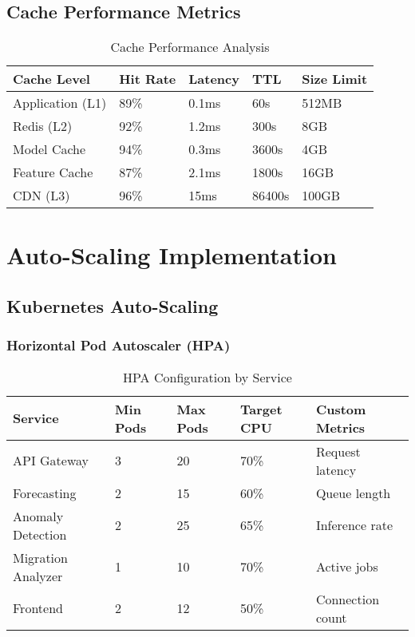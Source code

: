 \subsection{Cache Performance Metrics}

\begin{table}[H]
\centering
\caption{Cache Performance Analysis}
\begin{tabular}{|p{3cm}|p{2cm}|p{2cm}|p{2cm}|p{3cm}|}
\hline
\textbf{Cache Level} & \textbf{Hit Rate} & \textbf{Latency} & \textbf{TTL} & \textbf{Size Limit} \\
\hline
Application (L1) & 89\% & 0.1ms & 60s & 512MB \\
\hline
Redis (L2) & 92\% & 1.2ms & 300s & 8GB \\
\hline
Model Cache & 94\% & 0.3ms & 3600s & 4GB \\
\hline
Feature Cache & 87\% & 2.1ms & 1800s & 16GB \\
\hline
CDN (L3) & 96\% & 15ms & 86400s & 100GB \\
\hline
\end{tabular}
\end{table}

\section{Auto-Scaling Implementation}

\subsection{Kubernetes Auto-Scaling}

\subsubsection{Horizontal Pod Autoscaler (HPA)}

\begin{table}[H]
\centering
\caption{HPA Configuration by Service}
\begin{tabular}{|p{3cm}|p{2cm}|p{2cm}|p{2cm}|p{3cm}|}
\hline
\textbf{Service} & \textbf{Min Pods} & \textbf{Max Pods} & \textbf{Target CPU} & \textbf{Custom Metrics} \\
\hline
API Gateway & 3 & 20 & 70\% & Request latency \\
\hline
Forecasting & 2 & 15 & 60\% & Queue length \\
\hline
Anomaly Detection & 2 & 25 & 65\% & Inference rate \\
\hline
Migration Analyzer & 1 & 10 & 70\% & Active jobs \\
\hline
Frontend & 2 & 12 & 50\% & Connection count \\
\hline
\end{tabular}
\end{table}

